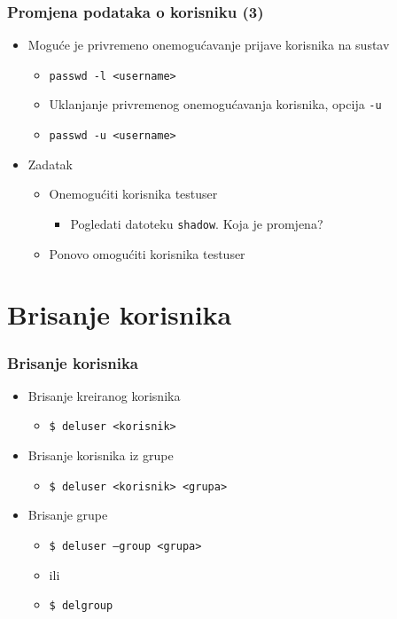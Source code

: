 \documentclass{beamer}
\newcommand{\shell}[1]{\texttt{#1}}
\begin{document}
\begin{frame}[t]
\frametitle{Promjena podataka o korisniku (3)}
\begin{itemize}
  \item Moguće je privremeno onemogućavanje prijave korisnika na sustav
  \begin{itemize}
    \item[] \shell{passwd -l <username>}
    \item Uklanjanje privremenog onemogućavanja korisnika, opcija 
          \shell{-u}
    \item[] \shell{passwd -u <username>} 
  \end{itemize}
  \item Zadatak
  \begin{itemize}
    \item Onemogućiti korisnika testuser
    \begin{itemize}
      \item Pogledati datoteku \shell{shadow}. Koja je promjena?
    \end{itemize}
    \item Ponovo omogućiti korisnika testuser
  \end{itemize}
\end{itemize}
\end{frame}

\section{Brisanje korisnika}
\begin{frame}[t]
\frametitle{Brisanje korisnika}
\begin{itemize}
  \item Brisanje kreiranog korisnika
  \begin{itemize}
    \item[] \shell{\$ deluser <korisnik>}
  \end{itemize}
  \item Brisanje korisnika iz grupe
  \begin{itemize}
    \item[] \shell{\$ deluser <korisnik> <grupa>}
  \end{itemize}
  \item Brisanje grupe
  \begin{itemize}
    \item[] \shell{\$ deluser –group <grupa>}
    \item[] ili
    \item[] \shell{\$ delgroup}
  \end{itemize}
\end{itemize}
\end{frame}
\end{document}
